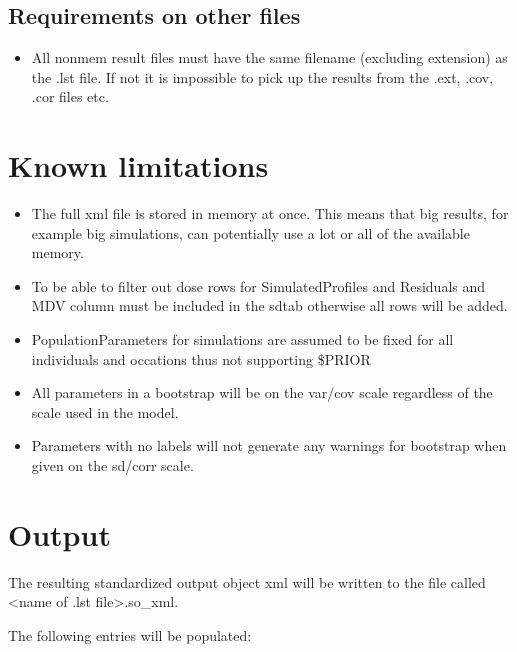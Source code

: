 \subsection{Requirements on other files}
\begin{itemize}
    \item All nonmem result files must have the same filename (excluding extension) as the .lst file. If not it is impossible to pick up the results from the .ext, .cov, .cor files etc.
\end{itemize}

\section{Known limitations}
\begin{itemize}
    \item The full xml file is stored in memory at once. This means that big results, for example big simulations, can potentially use a lot or all of the available memory.
    \item To be able to filter out dose rows for SimulatedProfiles and Residuals and MDV column must be included in the sdtab otherwise all rows will be added.
    \item PopulationParameters for simulations are assumed to be fixed for all individuals and occations thus not supporting \$PRIOR
    \item All parameters in a bootstrap will be on the var/cov scale regardless of the scale used in the model.
    \item Parameters with no labels will not generate any warnings for bootstrap when given on the sd/corr scale.
\end{itemize}

\section{Output}

The resulting standardized output object xml will be written to the file called <name of .lst file>.so\_xml.

The following entries will be populated:

